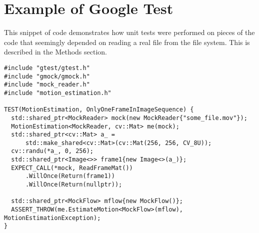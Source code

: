 \chapter{\label{ap:google_test}Example of Google Test}
This snippet of code demonstrates how unit tests were performed on pieces
of the code that seemingly depended on reading a real file from the file
system. This is described in the Methods section.
\begin{verbatim}
#include "gtest/gtest.h"
#include "gmock/gmock.h"
#include "mock_reader.h"
#include "motion_estimation.h"

TEST(MotionEstimation, OnlyOneFrameInImageSequence) {
  std::shared_ptr<MockReader> mock(new MockReader{"some_file.mov"});
  MotionEstimation<MockReader, cv::Mat> me(mock);
  std::shared_ptr<cv::Mat> a_ =
      std::make_shared<cv::Mat>(cv::Mat(256, 256, CV_8U));
  cv::randu(*a_, 0, 256);
  std::shared_ptr<Image<>> frame1{new Image<>(a_)};
  EXPECT_CALL(*mock, ReadFrameMat())
      .WillOnce(Return(frame1))
      .WillOnce(Return(nullptr));

  std::shared_ptr<MockFlow> mflow{new MockFlow()};
  ASSERT_THROW(me.EstimateMotion<MockFlow>(mflow), MotionEstimationException);
}
\end{verbatim}
